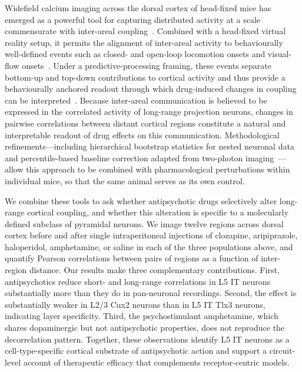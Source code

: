 \documentclass[11pt]{article}
\begin{document}
Widefield calcium imaging across the dorsal cortex of head-fixed mice has emerged as a powerful tool for capturing distributed activity at a scale commensurate with inter-areal coupling~\citep{musall2019single, leinweber2017sensorimotor}. Combined with a head-fixed virtual reality setup, it permits the alignment of inter-areal activity to behaviourally well-defined events such as closed- and open-loop locomotion onsets and visual-flow onsets~\citep{leinweber2017sensorimotor, keller2012sensorimotor, attinger2017visuomotor, keller2018predictive}. Under a predictive-processing framing, these events separate bottom-up and top-down contributions to cortical activity and thus provide a behaviourally anchored readout through which drug-induced changes in coupling can be interpreted~\citep{keller2018predictive, zmarz2016mismatch}. Because inter-areal communication is believed to be expressed in the correlated activity of long-range projection neurons, changes in pairwise correlations between distant cortical regions constitute a natural and interpretable readout of drug effects on this communication. Methodological refinements---including hierarchical bootstrap statistics for nested neuronal data~\citep{saravanan2020hierarchical} and percentile-based baseline correction adapted from two-photon imaging~\citep{dombeck2007imaging}---allow this approach to be combined with pharmacological perturbations within individual mice, so that the same animal serves as its own control.

We combine these tools to ask whether antipsychotic drugs selectively alter long-range cortical coupling, and whether this alteration is specific to a molecularly defined subclass of pyramidal neurons. We image twelve regions across dorsal cortex before and after single intraperitoneal injections of clozapine, aripiprazole, haloperidol, amphetamine, or saline in each of the three populations above, and quantify Pearson correlations between pairs of regions as a function of inter-region distance. Our results make three complementary contributions. First, antipsychotics reduce short- and long-range correlations in L5 IT neurons substantially more than they do in pan-neuronal recordings. Second, the effect is substantially weaker in L2/3 Cux2 neurons than in L5 IT Tlx3 neurons, indicating layer specificity. Third, the psychostimulant amphetamine, which shares dopaminergic but not antipsychotic properties, does not reproduce the decorrelation pattern. Together, these observations identify L5 IT neurons as a cell-type-specific cortical substrate of antipsychotic action and support a circuit-level account of therapeutic efficacy that complements receptor-centric models.
\end{document}

